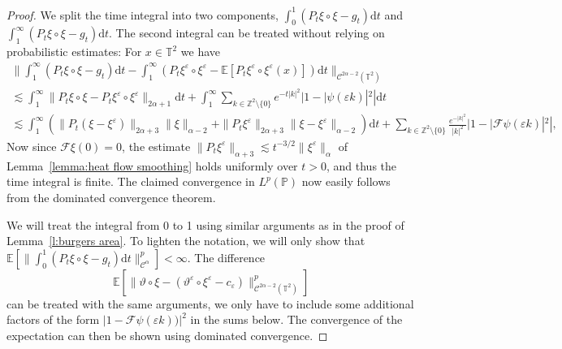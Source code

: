 \documentclass[11pt,a4paper]{article}
\newcommand{\mathd}{\mathrm{d}}
\theoremstyle{remark}
\newcommand{\Z}{\mathbb{Z}}
\newcommand{\E}{\mathbb{E}}
\newcommand{\CC}{\ensuremath{\mathscr{C}}}
\newcommand{\CF}{\ensuremath{\mathscr{F}}}
\begin{document}
\begin{proof}
   We split the time integral into two components, $\int_0^1 (P_t \xi \circ \xi - g_t) \mathd t$ and $\int_1^\infty (P_t \xi \circ \xi - g_t) \mathd t$. The second integral can be treated without relying on probabilistic estimates: For $x \in \mathbb{T}^2$ we have
   \begin{gather*}
      \bigg\| \int_1^\infty (P_t \xi \circ \xi - g_t) \mathd t - \int_1^\infty (P_t \xi^\varepsilon \circ \xi^\varepsilon - \E[P_t \xi^\varepsilon \circ \xi^\varepsilon(x)]) \mathd t \bigg\|_{\CC^{2\alpha-2}(\mathbb{T}^2)} \\
      \lesssim \int_1^\infty \| P_t \xi \circ \xi - P_t \xi^\varepsilon \circ \xi^\varepsilon \|_{2\alpha + 1} \mathd t + \int_1^\infty \sum_{k \in \Z^2 \setminus\{0\}} e^{-t |k|^2} |1 - |\psi(\varepsilon k)|^2| \mathd t \\
      \lesssim  \int_1^\infty (\| P_t (\xi - \xi^\varepsilon) \|_{2\alpha + 3} \| \xi \|_{\alpha-2} + \| P_t \xi^\varepsilon \|_{2 \alpha + 3} \| \xi - \xi^\varepsilon \|_{\alpha - 2}) \mathd t + \sum_{k \in \Z^2 \setminus\{0\}} \frac{e^{- |k|^2}}{|k|^2} |1 - |\CF \psi(\varepsilon k)|^2|,
   \end{gather*}
   Now since $\CF \xi (0) = 0$, the estimate $\| P_t \xi^\varepsilon \|_{\alpha + 3} \lesssim t^{-3/2} \| \xi^\varepsilon \|_\alpha$ of Lemma~\ref{lemma:heat flow smoothing} holds uniformly over $t > 0$, and thus the time integral is finite. The claimed convergence in $L^p(\mathbb{P})$ now easily follows from the dominated convergence theorem.
   
   We will treat the integral from 0 to 1 using similar arguments as in the proof of Lemma~\ref{l:burgers area}. To lighten the notation, we will only show that $\E[\| \int_0^1 (P_t \xi \circ \xi - g_t) \mathd t\|_{\CC^\alpha}^p]<\infty$. The difference
   \[
      \E[ \| \vartheta \circ \xi - ( \vartheta^\varepsilon \circ \xi^\varepsilon - c_\varepsilon) \|_{\CC^{2\alpha - 2}(\mathbb{T}^2)}^p]
   \]
   can be treated with the same arguments, we only have to include some additional factors of the form $|1 - \CF \psi (\varepsilon k))|^2$ in the sums below. The convergence of the expectation can then be shown using dominated convergence.
   

\end{proof}
\end{document}
